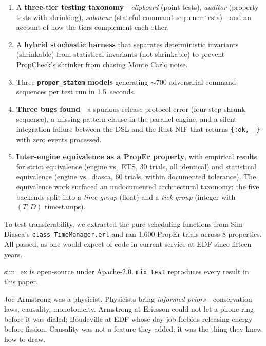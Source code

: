 \documentclass[sigplan,review,anonymous=false]{acmart}
\begin{document}
\begin{enumerate}
\item A \textbf{three-tier testing taxonomy}---\emph{clipboard} (point
  tests), \emph{auditor} (property tests with shrinking),
  \emph{saboteur} (stateful command-sequence tests)---and an account of
  how the tiers complement each other.

\item A \textbf{hybrid stochastic harness} that separates deterministic
  invariants (shrinkable) from statistical invariants (not shrinkable) to
  prevent PropCheck's shrinker from chasing Monte Carlo noise.

\item Three \textbf{\texttt{proper\_statem} models} generating
  ${\sim}700$ adversarial command sequences per test run in 1.5~seconds.

\item \textbf{Three bugs found}---a spurious-release protocol error
  (four-step shrunk sequence), a missing pattern clause in the parallel
  engine, and a silent integration failure between the DSL and the Rust
  NIF that returns \texttt{\{:ok, \_\}} with zero events processed.

\item \textbf{Inter-engine equivalence as a PropEr property}, with
  empirical results for strict equivalence (engine vs.\ ETS, 30 trials,
  all identical) and statistical equivalence (engine vs.\ diasca, 60
  trials, within documented tolerance). The equivalence work surfaced an
  undocumented architectural taxonomy: the five backends split into a
  \emph{time group} (float) and a \emph{tick group} (integer with
  $(T, D)$ timestamps).
\end{enumerate}

To test transferability, we extracted the pure scheduling functions from
Sim-Diasca's \texttt{class\_TimeManager.erl} and ran 1,600 PropEr
trials across 8 properties. All passed, as one would expect of code in
current service at EDF since fifteen years.

sim\_ex is open-source under Apache-2.0. \texttt{mix test} reproduces
every result in this paper.

Joe Armstrong was a physicist. Physicists bring \emph{informed
priors}---conservation laws, causality, monotonicity. Armstrong at
Ericsson could not let a phone ring before it was dialed; Boudeville at
EDF whose day job forbids releasing energy before fission. Causality was
not a feature they added; it was the thing they knew how to draw.
\end{document}
